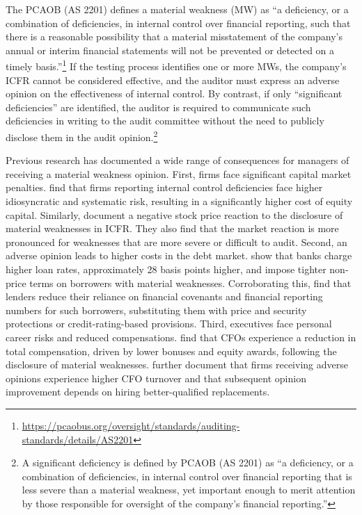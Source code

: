 \documentclass[12pt, a4paper]{report}
\begin{document}
The PCAOB (AS 2201) defines a material weakness (MW) as ``a deficiency, or a combination of deficiencies, in internal control over financial reporting, such that there is a reasonable possibility that a material misstatement of the company's annual or interim financial statements will not be prevented or detected on a timely basis.''\footnote{\url{https://pcaobus.org/oversight/standards/auditing-standards/details/AS2201}}  If the testing process identifies one or more MWs, the company's ICFR cannot be considered effective, and the auditor must express an adverse opinion on the effectiveness of internal control. By contrast, if only ``significant deficiencies'' are identified, the auditor is required to communicate such deficiencies in writing to the audit committee without the need to publicly disclose them in the audit opinion.\footnote{A significant deficiency is defined by PCAOB (AS 2201) as ``a deficiency, or a combination of deficiencies, in internal control over financial reporting that is less severe than a material weakness, yet important enough to merit attention by those responsible for oversight of the company's financial reporting.''}

Previous research has documented a wide range of consequences for managers of receiving a material weakness opinion. First, firms face significant capital market penalties. \cite{ashbaugh-skaifeEffectSOXInternal2009} find that firms reporting internal control deficiencies face higher idiosyncratic and systematic risk, resulting in a significantly higher cost of equity capital. Similarly, \cite{hammersleyMarketReactionsDisclosure2008} document a negative stock price reaction to the disclosure of material weaknesses in ICFR. They also find that the market reaction is more pronounced for weaknesses that are more severe or difficult to audit. Second, an adverse opinion leads to higher costs in the debt market. \cite{kimInternalControlWeakness2011} show that banks charge higher loan rates, approximately 28 basis points higher, and impose tighter non-price terms on borrowers with material weaknesses. Corroborating this, \cite{costelloImpactFinancialReporting2011} find that lenders reduce their reliance on financial covenants and financial reporting numbers for such borrowers, substituting them with price and security protections or credit-rating-based provisions. Third, executives face personal career risks and reduced compensations. \cite{hoitashInternalControlMaterial2012} find that CFOs experience a reduction in total compensation, driven by lower bonuses and equity awards, following the disclosure of material weaknesses. \cite{liFinancialExecutiveQualifications2010} further document that firms receiving adverse opinions experience higher CFO turnover and that subsequent opinion improvement depends on hiring better-qualified replacements.
\end{document}
